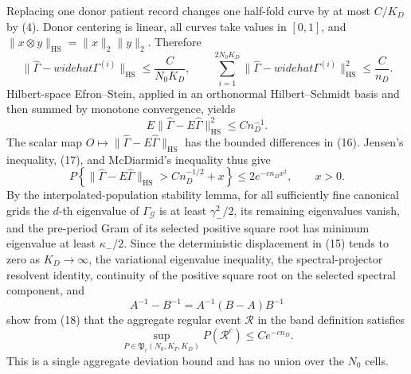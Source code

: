 Replacing one donor patient record changes one half-fold curve by at most \(C/K_D\) by (4).  Donor centering is linear, all curves take values in \([0,1]\), and
\(\|x\otimes y\|_{\mathrm{HS}}=\|x\|_2\|y\|_2\).  Therefore
\[
 \|\widehat\Gamma-widehat\Gamma^{(i)}\|_{\mathrm{HS}}
 \le \frac{C}{N_0K_D},
 \qquad
 \sum_{i=1}^{2N_0K_D}
 \|\widehat\Gamma-widehat\Gamma^{(i)}\|_{\mathrm{HS}}^2
 \le \frac{C}{n_D}.
\tag{16}
\]
Hilbert-space Efron--Stein, applied in an orthonormal Hilbert--Schmidt basis and then summed by monotone convergence, yields
\[
 E\|\widehat\Gamma-E\widehat\Gamma\|_{\mathrm{HS}}^2
 \le Cn_D^{-1}.
\tag{17}
\]
The scalar map
\(O\mapsto\|\widehat\Gamma-E\widehat\Gamma\|_{\mathrm{HS}}\) has the bounded differences in (16).  Jensen's inequality, (17), and McDiarmid's inequality thus give
\[
 P\left\{\|\widehat\Gamma-E\widehat\Gamma\|_{\mathrm{HS}}
 >Cn_D^{-1/2}+x\right\}
 \le 2e^{-cn_Dx^2},\qquad x>0.
\tag{18}
\]
By the interpolated-population stability lemma, for all sufficiently fine canonical grids the \(d\)-th eigenvalue of \(\Gamma_{\mathcal G}\) is at least \(\gamma_-^2/2\), its remaining eigenvalues vanish, and the pre-period Gram of its selected positive square root has minimum eigenvalue at least \(\kappa_-/2\).  Since the deterministic displacement in (15) tends to zero as \(K_D\to\infty\), the variational eigenvalue inequality, the spectral-projector resolvent identity, continuity of the positive square root on the selected spectral component, and
\[
 A^{-1}-B^{-1}=A^{-1}(B-A)B^{-1}
\tag{19}
\]
show from (18) that the aggregate regular event \(\mathcal R\) in the band definition satisfies
\[
 \sup_{P\in\mathfrak P_r(N_0,K_T,K_D)}P(\mathcal R^c)
 \le Ce^{-cn_D}.
\tag{20}
\]
This is a single aggregate deviation bound and has no union over the \(N_0\) cells.

